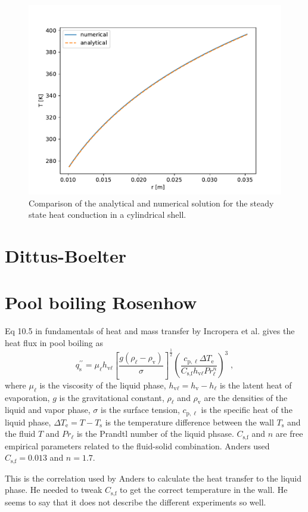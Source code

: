 \documentclass{article}
\begin{document}
\begin{figure}
    \includegraphics[width=\linewidth]{test_wall_conduction.pdf}
    \caption{Comparison of the analytical and numerical solution for the steady state heat conduction in a cylindrical shell.}
    \label{fig:validation_steady_state}
\end{figure}

\section{Dittus-Boelter}

\section{Pool boiling Rosenhow}
Eq 10.5 in fundamentals of heat and mass transfer by Incropera et al. gives the heat flux in pool boiling as
\begin{equation}
    q_{\text{s}}^{\prime\prime} = \mu_{\ell} h_{\text{v}\ell} \left[\frac{g\left( \rho_{\ell} - \rho_{\text{v}} \right)}{\sigma}\right]^{\frac{1}{2}} \left( \frac{c_{\text{p},\ell}\Delta T_{\text{e}}}{{C_{\text{s,f}}h_{\text{v}\ell}} Pr_{\ell}^n} \right)^{3}\;,
\end{equation}
where $\mu_{\ell}$ is the viscosity of the liquid phase, $h_{\text{v}\ell} = h_{\text{v}} - h_{\ell}$ is the latent heat of evaporation, $g$ is the gravitational constant, $\rho_{\ell}$ and $\rho_{\text{v}}$ are the densities of the liquid and vapor phase, $\sigma$ is the surface tension, $c_{\text{p},\ell}$ is the specific heat of the liquid phase, $\Delta T_{\text{e}} = T - T_{\text{s}}$ is the temperature difference between the wall $T_{\text{s}}$ and the fluid $T$ and $Pr_{\ell}$ is the Prandtl number of the liquid phsase. $C_{\text{s,f}}$ and $n$ are free empirical parameters related to the fluid-solid combination. Anders used $C_{\text{s,f}} = 0.013$ and $n=1.7$. 

This is the correlation used by Anders to calculate the heat transfer to the liquid phase. He needed to tweak $C_{\text{s,f}}$ to get the correct temperature in the wall. He seems to say that it does not describe the different experiments so well.
\end{document}
